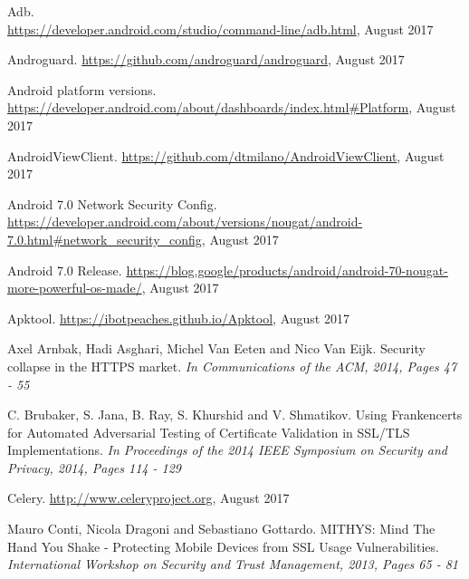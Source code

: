 \documentclass[draft,final]{vutinfth} %
\begin{document}


\printindex

\printglossaries

\begin{thebibliography}{99}

 Adb.\\\url{https://developer.android.com/studio/command-line/adb.html}, August 2017

 Androguard. \url{https://github.com/androguard/androguard}, August 2017

Android platform versions. \url{https://developer.android.com/about/dashboards/index.html#Platform}, August 2017

 AndroidViewClient. \url{https://github.com/dtmilano/AndroidViewClient}, August 2017

 Android 7.0 Network Security Config. \url{https://developer.android.com/about/versions/nougat/android-7.0.html#network_security_config}, August 2017

 Android 7.0 Release. \url{https://blog.google/products/android/android-70-nougat-more-powerful-os-made/}, August 2017

 Apktool. \url{https://ibotpeaches.github.io/Apktool}, August 2017

Axel Arnbak, Hadi Asghari, Michel Van Eeten and Nico Van Eijk. Security collapse in the HTTPS market. \textit{In Communications of the ACM, 2014, Pages 47 - 55}

C. Brubaker, S. Jana, B. Ray, S. Khurshid and V. Shmatikov. Using Frankencerts for Automated Adversarial Testing of Certificate Validation in SSL/TLS Implementations. \textit{In Proceedings of the 2014 IEEE Symposium on Security and Privacy, 2014, Pages 114 - 129}

 Celery. \url{http://www.celeryproject.org}, August 2017

 Mauro Conti, Nicola Dragoni and Sebastiano Gottardo. MITHYS: Mind The Hand You Shake - Protecting Mobile Devices from SSL Usage Vulnerabilities. \textit{International Workshop on Security and Trust Management, 2013, Pages 65 - 81}


\end{thebibliography}
\end{document}
